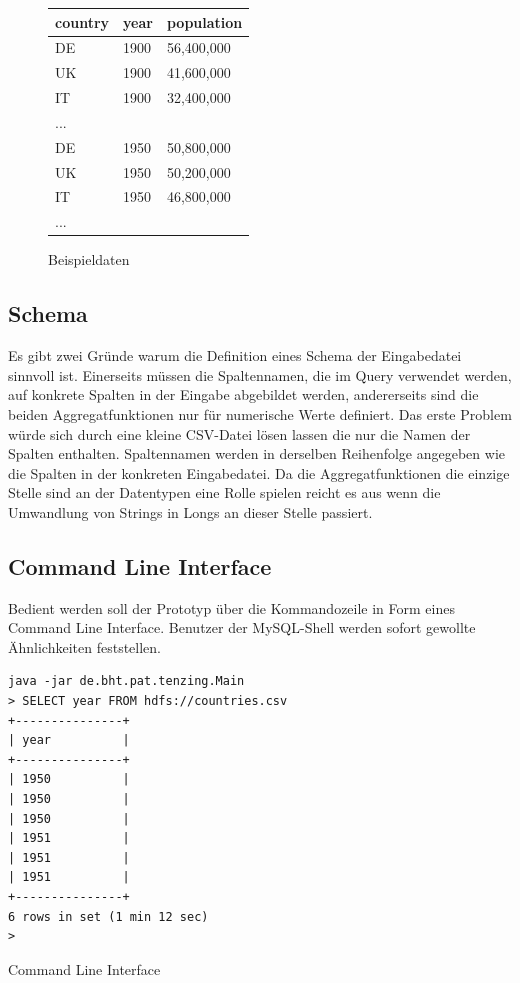\documentclass[a4paper]{article}
\begin{document}
\begin{figure}[H]
\centering
\begin{tabular}{l l l}
	\toprule
	country & year & population \\
	\midrule
	DE & 1900 & 56,400,000 \\
	UK & 1900 & 41,600,000 \\
	IT & 1900 & 32,400,000 \\
	... \\
	DE & 1950 & 50,800,000 \\
	UK & 1950 & 50,200,000 \\
	IT & 1950 & 46,800,000\\	
	... \\
	\bottomrule
\end{tabular}
\caption{Beispieldaten}
\label{fig:sampledata}
\end{figure}

\subsection{Schema}
Es gibt zwei Gründe warum die Definition eines Schema der Eingabedatei sinnvoll ist. Einerseits müssen die Spaltennamen, die im Query verwendet werden, auf konkrete Spalten in der Eingabe abgebildet werden, andererseits sind die beiden Aggregatfunktionen nur für numerische Werte definiert. Das erste Problem würde sich durch eine kleine CSV-Datei lösen lassen die nur die Namen der Spalten enthalten. Spaltennamen werden in derselben Reihenfolge angegeben wie die Spalten in der konkreten Eingabedatei. Da die Aggregatfunktionen die einzige Stelle sind an der Datentypen eine Rolle spielen reicht es aus wenn die Umwandlung von Strings in Longs an dieser Stelle passiert.


\subsection{Command Line Interface}
Bedient werden soll der Prototyp über die Kommandozeile in Form eines Command Line Interface. Benutzer der MySQL-Shell werden sofort gewollte Ähnlichkeiten feststellen.

\begin{listing}[H]
\begin{verbatim}
java -jar de.bht.pat.tenzing.Main
> SELECT year FROM hdfs://countries.csv
+---------------+
| year          |
+---------------+
| 1950          |
| 1950          |
| 1950          |
| 1951          |
| 1951          |
| 1951          |
+---------------+
6 rows in set (1 min 12 sec)
>
\end{verbatim}
\caption{Command Line Interface}
\label{lst:cli}
\end{listing}
\end{document}
